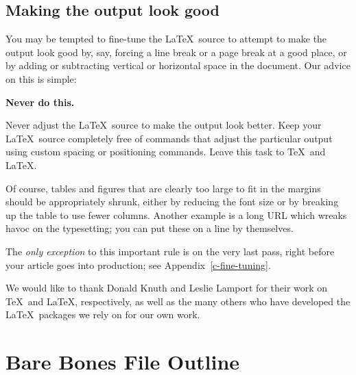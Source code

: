 \documentclass[openany]{now} %
\begin{document}
\section{Making the output look good}
\label{s-never-do-this}

You may be tempted to fine-tune the \LaTeX\ source to attempt to make the 
output look good
by, say, forcing a line break or a page break at a good place, or by adding 
or subtracting vertical or horizontal space in the document.
Our advice on this is simple:

\begin{center}
\textbf{Never do this.}
\end{center}

Never adjust the \LaTeX\ source to make the output look better.
Keep your \LaTeX\ source completely free of commands that adjust the 
particular output using custom spacing or positioning commands.
Leave this task to \TeX\ and \LaTeX.

Of course, tables and figures that are clearly too large to fit in
the margins should be appropriately shrunk, either by reducing the font size or
by breaking up the table to use fewer columns. Another example is a long URL
which wreaks havoc on the typesetting; you can put these on a line by
themselves.

The \emph{only exception} to this important rule is on the very last pass, 
right before your article goes into production; see Appendix~\ref{c-fine-tuning}.


\begin{acknowledgements}
We would like to thank Donald Knuth and Leslie Lamport for their work
on \TeX\ and \LaTeX, respectively, as well as the many others who
have developed the \LaTeX\ packages we rely on for our own work.
\end{acknowledgements}

\appendix

\chapter{Bare Bones File Outline}
\label{s-bare-bones}
\end{document}
